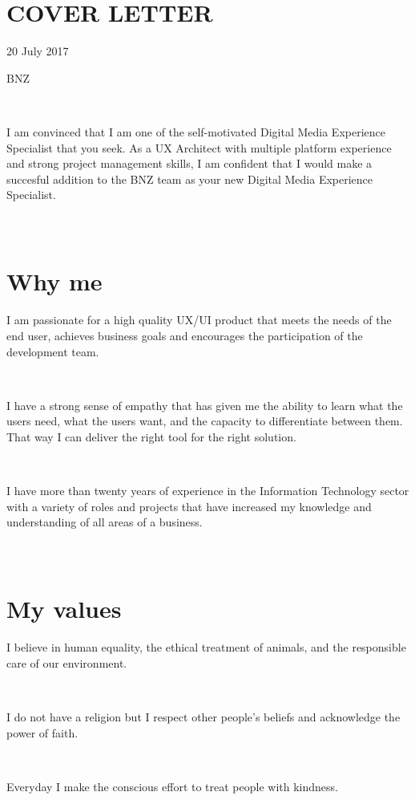 \documentclass{resume}
\begin{document}



\section{\\ COVER LETTER}
  \role{}{}
  20 July 2017\par
  BNZ\par
  ~\par
  I am convinced that I am one of the self-motivated Digital Media Experience Specialist that you seek. As a UX Architect with multiple platform experience and strong project management skills, I am confident that I would make a succesful addition to the BNZ team as your new Digital Media Experience Specialist.
  \par

\section{\\ Why me}
  \role{}{}
  I am passionate for a high quality UX/UI product that meets the needs of the end user, achieves business goals and encourages the participation of the development team.\par
  ~\par
  I have a strong sense of empathy that has given me the ability to learn what the users need, what the users want, and the capacity to differentiate between them. That way I can deliver the right tool for the right solution.\par
  ~\par
  I have more than twenty years of experience in the Information Technology sector with a variety of roles and projects that have increased my knowledge and understanding of all areas of a business.\par

\section{\\ My values}
  \role{}{}
  I believe in human equality, the ethical treatment of animals, and the responsible care of our environment.\par
  ~\par
  I do not have a religion but I respect other people's beliefs and acknowledge the power of faith.\par
  ~\par
  Everyday I make the conscious effort to treat people with kindness.\par
\end{document}
